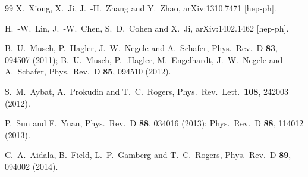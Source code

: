 \documentclass[aps,prd,preprint,tightenlines,superscriptaddress,nofootinbib]{revtex4}
\begin{document}
\begin{thebibliography}{99}
  X.~Xiong, X.~Ji, J.~-H.~Zhang and Y.~Zhao,
  arXiv:1310.7471 [hep-ph].
  
  H.~-W.~Lin, J.~-W.~Chen, S.~D.~Cohen and X.~Ji,
  arXiv:1402.1462 [hep-ph].

  
  B.~U.~Musch, P.~Hagler, J.~W.~Negele and A.~Schafer,
  Phys.\ Rev.\ D {\bf 83}, 094507 (2011);
  B.~U.~Musch, P.~.Hagler, M.~Engelhardt, J.~W.~Negele and A.~Schafer,
  Phys.\ Rev.\ D {\bf 85}, 094510 (2012).




  
  S.~M.~Aybat, A.~Prokudin and T.~C.~Rogers,
  Phys.\ Rev.\ Lett.\  {\bf 108}, 242003 (2012).
  
  P.~Sun and F.~Yuan,
  Phys.\ Rev.\ D {\bf 88}, 034016 (2013);
  Phys.\ Rev.\ D {\bf 88}, 114012 (2013).
  
  C.~A.~Aidala, B.~Field, L.~P.~Gamberg and T.~C.~Rogers,
  Phys.\ Rev.\ D {\bf 89}, 094002 (2014).


\end{thebibliography}
\end{document}
